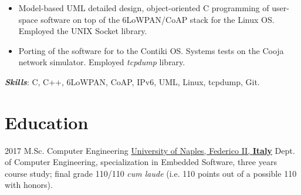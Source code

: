 \documentclass[letterpaper]{twentysecondcv} %
\begin{document}
\begin{twenty}
{            \vspace{2 mm}
            \begin{itemize}
                \item Model-based UML detailed design, object-oriented C programming of user-space software on top of the 6LoWPAN/CoAP stack for the Linux OS. Employed the UNIX Socket library.
                \item Porting of the software for to the Contiki OS. Systems tests on the Cooja network simulator. Employed \textit{tcpdump} library.
            \end{itemize}

            \vspace{2 mm}
            \textbf{\textit{Skills}}: C, C++, 6LoWPAN, CoAP, IPv6, UML, Linux, tcpdump, Git.
        }
\end{twenty}

\section{Education}
\begin{twenty}
	\twentyitem
        {2017}
    	{}
        {M.Sc. Computer Engineering}
        {\href{http://www.scuolapsb.unina.it/}{University of Naples, Federico II, \textbf{Italy}}}
        {}
        {
            Dept. of Computer Engineering, specialization in Embedded Software, three years course study; final grade 110/110 \textit{cum laude} (i.e. 110 points out of a possible 110 with honors).
        }
\end{twenty}
\end{document}
